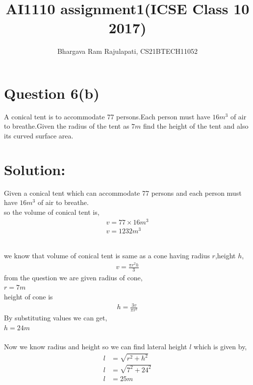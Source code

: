 \documentclass[article,12pt,twocolumn]{IEEEtran}
\title{AI1110 assignment1(ICSE Class 10 2017)}
\author{Bhargava Ram Rajulapati, CS21BTECH11052}
\begin{document}
  \maketitle
  \section*{Question 6(b)}
   A conical tent is to accommodate 77 persons.Each person must  
   have $16m^3$ of air to breathe.Given the radius of the tent as
   $7m$ find the height of the tent and also its curved surface
   area.\\
  \section*{Solution:}
  Given a conical tent which can accommodate 77 persons and each         
   person must have $16m^3$ of air to breathe.\\
  so the volume of conical tent is,
  \begin{align}
    v = 77 \times 16 m^3 \\
    v = 1232 m^3  
  \end{align}
  
  \begin{table}[h!]
     \centering
   
    \caption{}
    \label{table:Table1}
  \end{table} \\
  
  we know that volume of conical tent is same as a cone having
  radius $r$,height $h$,
  \begin{align}
     v = \frac{\pi r^2 h}{3} 
  \end{align}
  from the question we are given radius of cone, \\
  $ r = 7 m $\\ 
  height of cone is
  \begin{align}
   h = \frac{3 v}{\pi r^2} 
  \end{align}
  By substituting values we can get, \\
  $ h = 24 m $ \\\\
  
  Now we know radius and height so we can find lateral height $l$
  which is given by,
  \begin{align}
     l &= \sqrt{r^2 + h^2}
     \\
     l &= \sqrt{7^2 + 24^2}
     \\
     l &= 25 m
  \end{align} 
  
\end{document}
